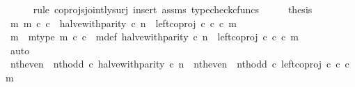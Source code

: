 \begin{isabellebody}
\ \ \ \ \isamarkupfalse%
\ {\isacharparenleft}{\kern0pt}rule\ coprojs{\isacharunderscore}{\kern0pt}jointly{\isacharunderscore}{\kern0pt}surj{\isacharcomma}{\kern0pt}\ insert\ assms{\isacharcomma}{\kern0pt}\ typecheck{\isacharunderscore}{\kern0pt}cfuncs{\isacharparenright}{\kern0pt}\isanewline
\ \ \isamarkupfalse%
\ \isamarkupfalse%
\ {\isacharquery}{\kern0pt}thesis\isanewline
\ \ \isamarkupfalse%
\ \isanewline
\ \ \ \ \isamarkupfalse%
\ {\isachardoublequoteopen}{\isasymexists}m{\isachardot}{\kern0pt}\ m\ {\isasymin}\isactrlsub c\ {\isasymnat}\isactrlsub c\ {\isasymand}\ halve{\isacharunderscore}{\kern0pt}with{\isacharunderscore}{\kern0pt}parity\ {\isasymcirc}\isactrlsub c\ n\ {\isacharequal}{\kern0pt}\ left{\isacharunderscore}{\kern0pt}coproj\ {\isasymnat}\isactrlsub c\ {\isasymnat}\isactrlsub c\ {\isasymcirc}\isactrlsub c\ m{\isachardoublequoteclose}\isanewline
\ \ \ \ \isamarkupfalse%
\ \isamarkupfalse%
\ m\ \ m{\isacharunderscore}{\kern0pt}type{\isacharcolon}{\kern0pt}\ {\isachardoublequoteopen}m\ {\isasymin}\isactrlsub c\ {\isasymnat}\isactrlsub c{\isachardoublequoteclose}\ \ m{\isacharunderscore}{\kern0pt}def{\isacharcolon}{\kern0pt}\ {\isachardoublequoteopen}halve{\isacharunderscore}{\kern0pt}with{\isacharunderscore}{\kern0pt}parity\ {\isasymcirc}\isactrlsub c\ n\ {\isacharequal}{\kern0pt}\ left{\isacharunderscore}{\kern0pt}coproj\ {\isasymnat}\isactrlsub c\ {\isasymnat}\isactrlsub c\ {\isasymcirc}\isactrlsub c\ m{\isachardoublequoteclose}\isanewline
\ \ \ \ \ \ \isamarkupfalse%
\ auto\isanewline
\ \ \ \ \isamarkupfalse%
\ \isamarkupfalse%
\ {\isachardoublequoteopen}{\isacharparenleft}{\kern0pt}{\isacharparenleft}{\kern0pt}nth{\isacharunderscore}{\kern0pt}even\ {\isasymamalg}\ nth{\isacharunderscore}{\kern0pt}odd{\isacharparenright}{\kern0pt}\ {\isasymcirc}\isactrlsub c\ halve{\isacharunderscore}{\kern0pt}with{\isacharunderscore}{\kern0pt}parity{\isacharparenright}{\kern0pt}\ {\isasymcirc}\isactrlsub c\ n\ {\isacharequal}{\kern0pt}\ {\isacharparenleft}{\kern0pt}{\isacharparenleft}{\kern0pt}nth{\isacharunderscore}{\kern0pt}even\ {\isasymamalg}\ nth{\isacharunderscore}{\kern0pt}odd{\isacharparenright}{\kern0pt}\ {\isasymcirc}\isactrlsub c\ left{\isacharunderscore}{\kern0pt}coproj\ {\isasymnat}\isactrlsub c\ {\isasymnat}\isactrlsub c{\isacharparenright}{\kern0pt}\ {\isasymcirc}\isactrlsub c\ m{\isachardoublequoteclose}\isanewline
\ \ \ \ \ \ \isamarkupfalse%

\end{isabellebody}

